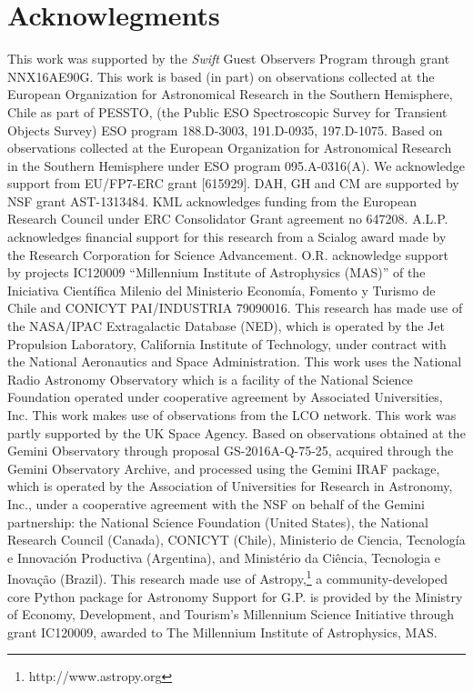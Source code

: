 \documentclass[a4paper,fleqn,usenatbib]{mnras}
\begin{document}
\section*{Acknowlegments}
This work was supported by the {\it Swift} Guest Observers Program through grant NNX16AE90G.
This work is based (in part) on observations collected at the European Organization for Astronomical Research in the Southern Hemisphere, Chile as part of PESSTO, (the Public ESO Spectroscopic Survey for Transient Objects Survey) ESO program 188.D-3003, 191.D-0935, 197.D-1075.
Based on observations collected at the European Organization for Astronomical Research in the Southern Hemisphere under ESO program 095.A-0316(A). 
We acknowledge support from EU/FP7-ERC grant [615929].
DAH, GH and CM are supported by NSF grant AST-1313484.
KML acknowledges funding from the European Research Council under ERC Consolidator Grant agreement no 647208.
A.L.P. acknowledges financial support for this research from a Scialog award made by the Research Corporation for Science Advancement.
O.R. acknowledge support by projects IC120009 ``Millennium Institute of Astrophysics (MAS)'' of the Iniciativa Cient\'ifica Milenio del Ministerio Econom\'ia, Fomento y Turismo de Chile and CONICYT PAI/INDUSTRIA 79090016. 
This research has made use of the NASA/IPAC Extragalactic Database (NED), which is operated by the Jet Propulsion Laboratory, California Institute of Technology, under contract with the National Aeronautics and Space Administration.
This work uses the National Radio Astronomy Observatory which is a facility of the National Science Foundation operated under cooperative agreement by Associated Universities, Inc.
This work makes use of observations from the LCO network. 
This work was partly supported by the UK Space Agency.
Based on observations obtained at the Gemini Observatory through proposal GS-2016A-Q-75-25, acquired through the Gemini Observatory Archive, and processed using the Gemini IRAF package, which is operated by the Association of Universities for Research in Astronomy, Inc., under a cooperative agreement with the NSF on behalf of the Gemini partnership: the National Science Foundation (United States), the National Research Council (Canada), CONICYT (Chile), Ministerio de Ciencia, Tecnolog\'{i}a e Innovaci\'{o}n Productiva (Argentina), and Minist\'{e}rio da Ci\^{e}ncia, Tecnologia e Inova\c{c}\~{a}o (Brazil).
This research made use of Astropy,\footnote{http://www.astropy.org} a community-developed core Python package for Astronomy \citep{astropy:2013, astropy:2018}
Support for G.P. is provided by the Ministry of Economy, Development, and Tourism's Millennium Science Initiative through grant IC120009, awarded to The Millennium Institute of Astrophysics, MAS.\\
\end{document}
